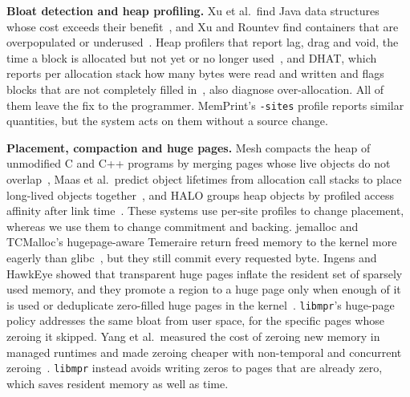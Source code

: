 \documentclass[11pt]{article}
\newcommand{\memprint}{MemPrint}
\newcommand{\libmpr}{\texttt{libmpr}}
\begin{document}
\textbf{Bloat detection and heap profiling.} Xu et al.\ find Java data structures whose cost exceeds their
benefit~\cite{Xu2010LowUtility}, and Xu and Rountev find containers that are overpopulated or
underused~\cite{Xu2010Containers}. Heap profilers that report lag, drag and void, the time a block is allocated
but not yet or no longer used~\cite{Rojemo1996Lag}, and DHAT, which reports per allocation stack how many bytes
were read and written and flags blocks that are not completely filled in~\cite{ValgrindDHAT}, also diagnose
over-allocation. All of them leave the fix to the programmer. \memprint{}'s \texttt{-sites} profile reports
similar quantities, but the system acts on them without a source change.

\textbf{Placement, compaction and huge pages.} Mesh compacts the heap of unmodified C and C++ programs by
merging pages whose live objects do not overlap~\cite{Powers2019Mesh}, Maas et al.\ predict object lifetimes from
allocation call stacks to place long-lived objects together~\cite{Maas2020Llama}, and HALO groups heap objects by
profiled access affinity after link time~\cite{Savage2020HALO}. These systems use per-site profiles to change
placement, whereas we use them to change commitment and backing. jemalloc and TCMalloc's hugepage-aware
Temeraire return freed memory to the kernel more eagerly than glibc~\cite{Evans2006jemalloc,Hunter2021Temeraire},
but they still commit every requested byte. Ingens and HawkEye showed that transparent huge pages inflate the
resident set of sparsely used memory, and they promote a region to a huge page only when enough of it is used
or deduplicate zero-filled huge pages in the kernel~\cite{Kwon2016Ingens,Panwar2019HawkEye}. \libmpr{}'s
huge-page policy addresses the same bloat from user space, for the specific pages whose zeroing it skipped.
Yang et al.\ measured the cost of zeroing new memory in managed runtimes and made zeroing cheaper with
non-temporal and concurrent zeroing~\cite{Yang2011Zeroing}. \libmpr{} instead avoids writing zeros to pages that
are already zero, which saves resident memory as well as time.
\end{document}
